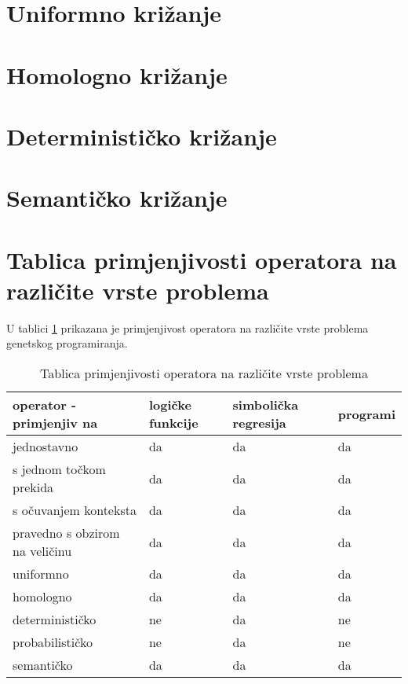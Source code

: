 \section{Uniformno križanje}


\section{Homologno križanje}


\section{Determinističko križanje}


\section{Semantičko križanje}


\section{Tablica primjenjivosti operatora na različite vrste problema}
U tablici \ref{crxtable} prikazana je primjenjivost operatora na različite vrste problema genetskog programiranja. 

\begin{table}[H]
 	\centering

    \caption{Tablica primjenjivosti operatora na različite vrste problema}
    \begin{tabular}{| l | l | l | l |}
    \hline
    \textbf{operator - primjenjiv na} & \textbf{logičke funkcije} & \textbf{simbolička regresija} & \textbf{programi}\\ \hline
    jednostavno & da & da & da\\ \hline
    s jednom točkom prekida & da & da & da\\ \hline
    s očuvanjem konteksta  & da & da & da\\ \hline
    pravedno s obzirom na veličinu  & da & da & da\\ \hline
    uniformno  & da & da & da\\\hline
    homologno  & da & da & da\\ \hline
    determinističko & ne & da & ne\\ \hline
    probabilističko  & ne & da & ne\\ \hline
    semantičko  & da & da & da\\ \hline
    \end{tabular}
    \label{crxtable}
\end{table}